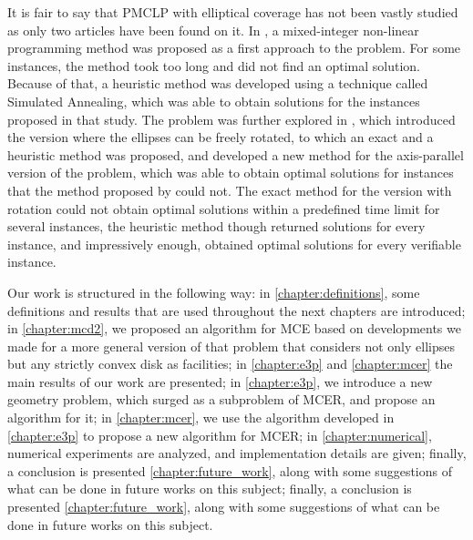 It is fair to say that PMCLP with elliptical coverage has not been vastly studied as only two articles have been found on it. In , a mixed-integer non-linear programming method was proposed as a first approach to the problem. For some instances, the method took too long and did not find an optimal solution. Because of that, a heuristic method was developed using a technique called Simulated Annealing, which was able to obtain solutions for the instances proposed in that study.
The problem was further explored in , which introduced the version where the ellipses can be freely rotated, to which an exact and a heuristic method was proposed, and developed a new method for the axis-parallel version of the problem, which was able to obtain optimal solutions for instances that the method proposed by  could not.
The exact method for the version with rotation could not obtain optimal solutions within a predefined time limit for several instances, the heuristic method though returned solutions for every instance, and impressively enough, obtained optimal solutions for every verifiable instance.

Our work is structured in the following way: in \autoref{chapter:definitions}, some definitions and results that are used throughout the next chapters are introduced; in \autoref{chapter:mcd2}, we proposed an algorithm for MCE based on developments we made for a more general version of that problem that considers not only ellipses but any strictly convex disk as facilities;
in \autoref{chapter:e3p} and  \autoref{chapter:mcer} the main results of our work are presented; in \autoref{chapter:e3p}, we introduce a new geometry problem, which surged as a subproblem of MCER, and propose an algorithm for it;
in \autoref{chapter:mcer}, we use the algorithm developed in \autoref{chapter:e3p} to propose a new algorithm for MCER; 
in \autoref{chapter:numerical}, numerical experiments are analyzed, and implementation details are given; finally, a conclusion is presented \autoref{chapter:future_work}, along with some suggestions of what can be done in future works on this subject; finally, a conclusion is presented \autoref{chapter:future_work}, along with some suggestions of what can be done in future works on this subject.